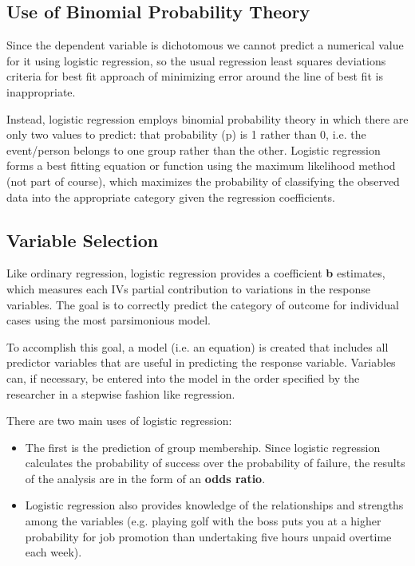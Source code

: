 \documentclass[a4paper,12pt]{article}
\begin{document}
\subsection{Use of Binomial Probability Theory}
Since the dependent variable is dichotomous we cannot predict a numerical value for it
using logistic regression, so the usual regression least squares deviations criteria for best fit
approach of minimizing error around the line of best fit is inappropriate.

Instead, logistic regression employs binomial probability theory in which there are only two values to
predict: that probability (p) is 1 rather than 0, i.e. the event/person belongs to one group
rather than the other. Logistic regression forms a best fitting equation or function using the
maximum likelihood method (not part of course), which maximizes the probability of classifying the observed
data into the appropriate category given the regression coefficients.

\subsection{Variable Selection}
Like ordinary regression, logistic regression provides a coefficient \textbf{b} estimates, which measures
each IVs partial contribution to variations in the response variables. The goal is to correctly predict
the category of outcome for individual cases using the most parsimonious model.

To accomplish this goal, a model (i.e. an equation) is created that includes all predictor variables that are useful in predicting the response variable. Variables can, if necessary, be entered into the model in the order specified by the researcher in a stepwise fashion like regression.

There are two main uses of logistic regression:
\begin{itemize}
\item The first is the prediction of group membership. Since logistic regression calculates the
probability of success over the probability of failure, the results of the analysis are in
the form of an \textbf{odds ratio}.
\item Logistic regression also provides knowledge of the relationships and strengths among
the variables (e.g. playing golf with the boss puts you at a higher probability for job
promotion than undertaking five hours unpaid overtime each week).
\end{itemize}
\end{document}
